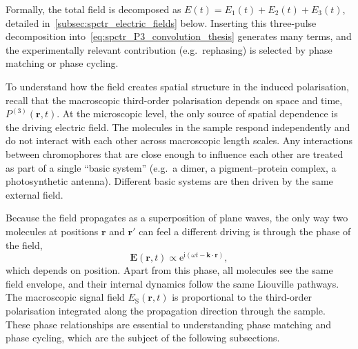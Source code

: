 Formally, the total field is decomposed as $E(t)=E_1(t)+E_2(t)+E_3(t)$, detailed in~\autoref{subsec:spctr_electric_fields} below.
Inserting this three-pulse decomposition into~\autoref{eq:spctr_P3_convolution_thesis} generates many terms, and the experimentally relevant contribution (e.g.\ rephasing) is selected by phase matching or phase cycling.

To understand how the field creates spatial structure in the induced polarisation, recall that the macroscopic third-order polarisation depends on space and time,
\(  P^{(3)}(\boldsymbol{r},t)\).
At the microscopic level, the only source of spatial dependence is the driving electric field. The molecules in the sample respond independently and do not interact with each other across macroscopic length scales. Any interactions between chromophores that are close enough to influence each other are treated as part of a single ``basic system'' (e.g.~a dimer, a pigment--protein complex, a photosynthetic antenna). Different basic systems are then driven by the same external field.

Because the field propagates as a superposition of plane waves, the only way two molecules at positions $\boldsymbol{r}$ and $\boldsymbol{r}'$ can feel a different driving is through the phase of the field,
\begin{equation*}
 \boldsymbol{E}(\boldsymbol{r},t) \propto \mathrm{e}^{\mathrm{i}(\omega t - \boldsymbol{k}\cdot\boldsymbol{r})},
\end{equation*}
which depends on position. Apart from this phase, all molecules see the same field envelope, and their internal dynamics follow the same Liouville pathways. The macroscopic signal field $E_{\mathrm{S}}(\boldsymbol{r},t)$ is proportional to the third-order polarisation integrated along the propagation direction through the sample. These phase relationships are essential to understanding phase matching and phase cycling, which are the subject of the following subsections.

